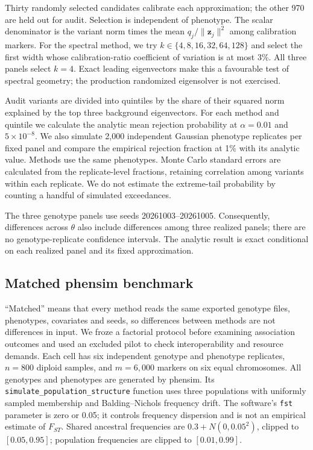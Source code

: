 \documentclass[11pt]{article}
\newcommand{\z}{\mathbf{z}}
\newcommand{\code}[1]{\texttt{#1}}
\begin{document}
Thirty randomly selected candidates calibrate each approximation;
the other 970 are held out for audit. Selection is independent of
phenotype. The scalar denominator is the variant norm times the mean
$q_j/\|\z_j\|^2$ among calibration markers. For the spectral method,
we try $k\in\{4,8,16,32,64,128\}$ and select the first width whose
calibration-ratio coefficient of variation is at most 3\%. All three
panels select $k=4$. Exact leading eigenvectors make this a favourable
test of spectral geometry; the production randomized eigensolver is not
exercised.

Audit variants are divided into quintiles by the share of their squared
norm explained by the top three background eigenvectors. For each method
and quintile we calculate the analytic mean rejection probability at
$\alpha=0.01$ and $5\times10^{-8}$. We also simulate 2,000 independent
Gaussian phenotype replicates per fixed panel and compare the empirical
rejection fraction at 1\% with its analytic value. Methods use the same
phenotypes. Monte Carlo standard errors are calculated from the
replicate-level fractions, retaining correlation among variants within
each replicate. We do not estimate the extreme-tail probability by
counting a handful of simulated exceedances.

The three genotype panels use seeds 20261003--20261005. Consequently,
differences across $\theta$ also include differences among three realized
panels; there are no genotype-replicate confidence intervals. The
analytic result is exact conditional on each realized panel and its
fixed approximation.

\subsection{Matched phensim benchmark}
\label{sec:phensim-design}

``Matched'' means that every method reads the same exported genotype files,
phenotypes, covariates and seeds, so differences between methods are not
differences in input. We froze a factorial protocol before examining association outcomes and
used an excluded pilot to check interoperability and resource demands.
Each cell has six independent genotype and phenotype replicates,
$n=800$ diploid samples, and $m=6{,}000$ markers on six equal chromosomes.
All genotypes and phenotypes are generated by phensim. Its
\code{simulate\_population\_structure} function uses three populations
with uniformly sampled membership and Balding--Nichols frequency drift.
The software's \code{fst} parameter is zero or 0.05; it controls frequency
dispersion and is not an empirical estimate of $F_{ST}$.
Shared ancestral frequencies are $0.3+N(0,0.05^2)$, clipped to
$[0.05,0.95]$; population frequencies are clipped to $[0.01,0.99]$.
\end{document}

